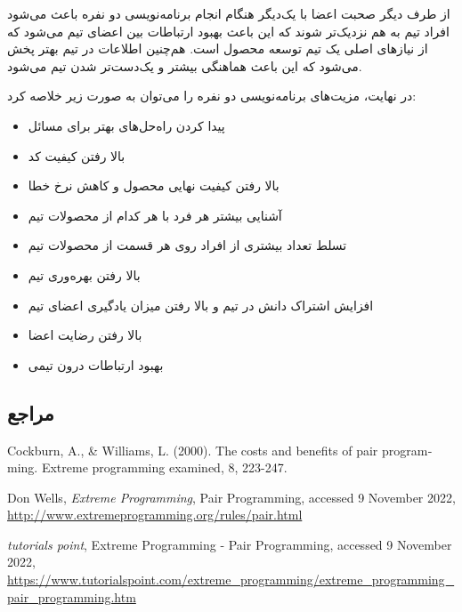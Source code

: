 {از طرف دیگر صحبت اعضا با یک‌دیگر هنگام انجام برنامه‌نویسی دو نفره باعث می‌شود افراد تیم به هم نزدیک‌تر شوند که این باعث بهبود ارتباطات بین اعضای تیم می‌شود که از نیازهای اصلی یک تیم توسعه محصول است. هم‌چنین اطلاعات در تیم بهتر پخش می‌شود که این باعث هماهنگی بیشتر و یک‌دست‌تر شدن تیم می‌شود.


در نهایت، مزیت‌های برنامه‌نویسی دو نفره را می‌توان به صورت زیر خلاصه کرد:

\begin{itemize}
	
	\item
	پیدا کردن راه‌حل‌های بهتر برای مسائل
	
	\item
	بالا رفتن کیفیت کد
	
	\item
	بالا رفتن کیفیت نهایی محصول و کاهش نرخ خطا
	
	\item
	آشنایی بیشتر هر فرد با هر کدام از محصولات تیم 
	
	\item
	تسلط تعداد بیشتری از افراد روی هر قسمت از محصولات تیم
	
	
	\item 
بالا رفتن بهره‌وری تیم
	
	\item
	افزایش اشتراک دانش در تیم و بالا رفتن میزان یادگیری اعضای تیم
	
	\item
	بالا رفتن رضایت اعضا
	
	\item 
	بهبود ارتباطات درون تیمی
	
\end{itemize}


\subsection*{مراجع}

\begin{latin}
	\begingroup
	\renewcommand{\section}[2]{}%
	
	\begin{thebibliography}{9}
		
		Cockburn, A., \& Williams, L. (2000). The costs and benefits of pair programming. Extreme programming examined, 8, 223-247.
		
		
		Don Wells,
		\textit{Extreme Programming},
		Pair Programming,
		accessed 9 November 2022,
		\url{http://www.extremeprogramming.org/rules/pair.html}
		

		
		\textit{tutorials point},
		Extreme Programming - Pair Programming,
		accessed 9 November 2022,
		\url{https://www.tutorialspoint.com/extreme\_programming/extreme\_programming\_pair\_programming.htm}
		

	\end{thebibliography}
	\endgroup
\end{latin}

}